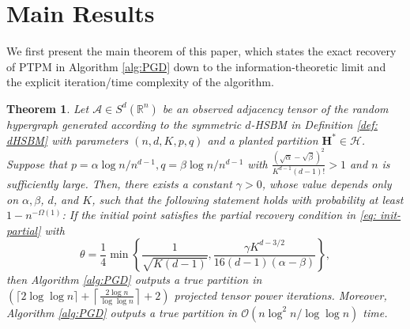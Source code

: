 \documentclass{article}
\theoremstyle{plain}
\newtheorem{theorem}{Theorem}[section] %
\theoremstyle{definition}
\theoremstyle{remark}
\newcommand{\Br}{\mathbb{R}}
\newcommand{\HCal}{\mathcal{H}}
\newcommand{\OCal}{\mathcal{O}}
\newcommand{\TCal}{\mathcal{T}}
\newcommand{\ACal}{\mathcal{A}}
\begin{document}
\section{Main Results} \label{sec: mainresults}
We first present the main theorem of this paper, which states the exact recovery of PTPM in Algorithm \ref{alg:PGD} down to the information-theoretic limit and the explicit iteration/time complexity of the algorithm.
\begin{theorem}\label{thm: time complexity}
	Let $\ACal \in S^d(\Br^n)$ be an observed adjacency tensor of the random hypergraph generated according to the symmetric $d$-HSBM in Definition \ref{def: dHSBM} with parameters $(n,d, K, p, q)$ and a planted partition $\boldsymbol{H}^* \in \HCal$. Suppose that $p=\alpha \log n/n^{d-1}, q=\beta \log n/n^{d-1}$ with $\frac{(\sqrt{\alpha} - \sqrt{\beta})^2}{K^{d-1}(d-1)!}>1$ and $n$ is sufficiently large. Then, there exists a constant $\gamma>0$, whose value depends only on $\alpha, \beta$, $d$, and $K$, such that the following statement holds with probability at least $1-n^{-\Omega(1)}$: If the initial point satisfies the partial recovery condition in \eqref{eq: init-partial} with
	\begin{equation}
		\theta = \frac{1}{4} \min \left\{\frac{1}{\sqrt{K(d-1)}}, \frac{\gamma K^{d-3/2}}{16(d-1)(\alpha - \beta)} \right\},
	\end{equation}
	then Algorithm \ref{alg:PGD} outputs a true partition in $\left(\lceil 2 \log \log n\rceil+\left\lceil\frac{2 \log n}{\log \log n}\right\rceil+2 \right)$ projected tensor power iterations. Moreover, Algorithm \ref{alg:PGD} outputs a true partition in $\OCal(n \log^2 n/\log \log n)$ time.
\end{theorem}

\end{document}
